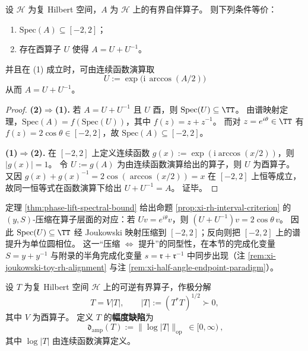 \begin{theorem}\label{thm:phase-lift-spectral-bound}
设 \(\mathcal H\) 为复 Hilbert 空间，\(A\) 为 \(\mathcal H\) 上的有界自伴算子。
则下列条件等价：
\begin{enumerate}
  \item \(\mathrm{Spec}(A)\subseteq[-2,2]\)；
  \item 存在酉算子 \(U\) 使得 \(A=U+U^{-1}\)。
\end{enumerate}
并且在 (1) 成立时，可由连续函数演算取
\[
\boxed{\ U:=\exp\!\bigl(\mathrm{i}\,\arccos(A/2)\bigr)\ }
\]
从而 \(A=U+U^{-1}\)。
\end{theorem}
\begin{proof}
\textbf{(2)\(\Rightarrow\)(1).}
若 \(A=U+U^{-1}\) 且 \(U\) 酉，则 \(\mathrm{Spec}(U)\subseteq\TT\)。
由谱映射定理，\(\mathrm{Spec}(A)=f(\mathrm{Spec}(U))\)，其中 \(f(z)=z+z^{-1}\)。
而对 \(z=e^{i\theta}\in\TT\) 有 \(f(z)=2\cos\theta\in[-2,2]\)，故 \(\mathrm{Spec}(A)\subseteq[-2,2]\)。
\par
\textbf{(1)\(\Rightarrow\)(2).}
在 \([-2,2]\) 上定义连续函数 \(g(x):=\exp(\mathrm{i}\arccos(x/2))\)，则 \(|g(x)|=1\)。
令 \(U:=g(A)\) 为由连续函数演算给出的算子，则 \(U\) 为酉算子。
又因 \(g(x)+g(x)^{-1}=2\cos(\arccos(x/2))=x\) 在 \([-2,2]\) 上恒等成立，
故同一恒等式在函数演算下给出
\(
U+U^{-1}=A
\)。
证毕。
\end{proof}

\begin{remark}\label{rem:phase-lift-joukowski-operator}
定理 \ref{thm:phase-lift-spectral-bound} 给出命题 \ref{prop:xi-rh-interval-criterion} 的 \((y,S)\)-压缩在算子层面的对应：若 \(Uv=e^{i\theta}v\)，则 \((U+U^{-1})v=2\cos\theta\,v\)。
因此 \(\mathrm{Spec}(U)\subseteq\TT\) 经 Joukowski 映射压缩到 \([-2,2]\)；反向则把 \([-2,2]\) 上的谱提升为单位圆相位。
这一“压缩 \(\Leftrightarrow\) 提升”的同型性，在本节的完成化变量 \(S=y+y^{-1}\) 与附录的半角完成化变量 \(s=\mathfrak{r}+\mathfrak{r}^{-1}\) 中同步出现（注 \ref{rem:xi-joukowski-toy-rh-alignment} 与注 \ref{rem:xi-half-angle-endpoint-paradigm}）。
\end{remark}

\begin{definition}\label{def:amp-defect}
设 \(T\) 为复 Hilbert 空间 \(\mathcal H\) 上的可逆有界算子，作极分解
\[
T=V|T|,\qquad |T|:=(T^\ast T)^{1/2}\succ 0,
\]
其中 \(V\) 为酉算子。
定义 \(T\) 的\textbf{幅度缺陷}为
\[
\boxed{\ \mathfrak{d}_{\mathrm{amp}}(T):=\bigl\|\log|T|\bigr\|_{\mathrm{op}}\ \in[0,\infty)\ },
\]
其中 \(\log|T|\) 由连续函数演算定义。
\end{definition}

